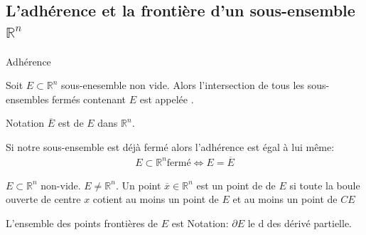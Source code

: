 \subsection{L'adhérence et la frontière d'un sous-ensemble $ \mathbb{R}^n $}
\begin{parag}{Adhérence}
    \begin{definition}
        Soit $E \subset \mathbb{R}^n $ sous-enesemble non vide. Alors l'intersection de tous les sous-ensembles fermés contenant $E$ est appelée .
    \end{definition}
    \begin{subparag}{Notation}
        $ \overline{E}$ est  de $E$ dans $ \mathbb{R}^n $.
        \begin{framedremark}
            Si notre sous-ensemble est déjà fermé alors l'adhérence est égal à lui même:
            \begin{align*}
                E \subset \mathbb{R}^n  \text{fermé} \iff E = \overline{E}
            \end{align*}
            
        \end{framedremark}
        
    \end{subparag}
\begin{definition}
    $E \subset \mathbb{R}^n $ non-vide. $E \neq \mathbb{R}^n $. Un point $ \overline{x} \in \mathbb{R}^n $ est un point de  de $E$ si toute la boule ouverte de centre $x$ cotient au moins un point de  $E$ et au moins un point de $CE$
\end{definition}
L'ensemble des points frontières de $E$ est  Notation: $ \partial E$ le d des dérivé partielle.


\end{parag}
